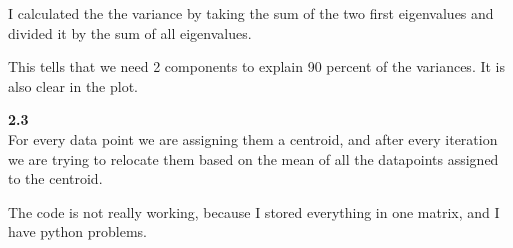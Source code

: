 \documentclass[12pt]{article}
\begin{document}
{I calculated the the variance by taking the sum of the two first eigenvalues and divided it by the sum of all eigenvalues.

This tells that we need 2 components to explain 90 percent of the variances. It is also clear in the plot.



\textbf{2.3}\\

For every data point we are assigning them a centroid, and after every iteration we are trying to relocate them based on the mean of all the datapoints assigned to the centroid.

The code is not really working, because I stored everything in one matrix, and I have python problems.


}
\end{document}
